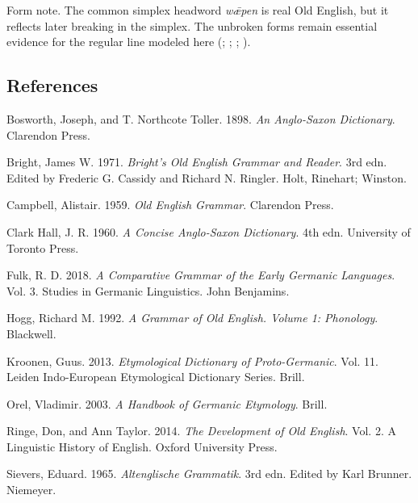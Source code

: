 \documentclass[
  british,
  a4paper,
]{article}
\newlength{\cslhangindent}
\newenvironment{CSLReferences}[2] %
 {\begin{list}{}{%
  \setlength{\itemindent}{0pt}
  \setlength{\leftmargin}{0pt}
  \setlength{\parsep}{0pt}
  \ifodd #1
   \setlength{\leftmargin}{\cslhangindent}
   \setlength{\itemindent}{-1\cslhangindent}
  \fi
  \setlength{\itemsep}{#2\baselineskip}}}
 {\end{list}}
\begin{document}
Form note. The common simplex headword \emph{wǣpen} is real Old English,
but it reflects later breaking in the simplex. The unbroken forms remain
essential evidence for the regular line modeled here
(;
;
;
).

\clearpage

\subsection*{References}\label{references}

\protect{}\label{refs}
\begin{CSLReferences}{1}{1}
Bosworth, Joseph, and T. Northcote Toller. 1898. \emph{An {Anglo-Saxon}
Dictionary}. Clarendon Press.

Bright, James W. 1971. \emph{Bright's {Old English} Grammar and Reader}.
3rd edn. Edited by Frederic G. Cassidy and Richard N. Ringler. Holt,
Rinehart; Winston.

Campbell, Alistair. 1959. \emph{Old {English} Grammar}. Clarendon Press.

Clark Hall, J. R. 1960. \emph{A Concise {Anglo-Saxon} Dictionary}. 4th
edn. University of Toronto Press.

Fulk, R. D. 2018. \emph{A Comparative Grammar of the Early {Germanic}
Languages}. Vol. 3. Studies in Germanic Linguistics. John Benjamins.

Hogg, Richard M. 1992. \emph{A Grammar of Old English. Volume 1:
Phonology}. Blackwell.

Kroonen, Guus. 2013. \emph{Etymological Dictionary of {Proto-Germanic}}.
Vol. 11. Leiden Indo-European Etymological Dictionary Series. Brill.

Orel, Vladimir. 2003. \emph{A Handbook of {Germanic} Etymology}. Brill.

Ringe, Don, and Ann Taylor. 2014. \emph{The Development of {Old
English}}. Vol. 2. A Linguistic History of English. Oxford University
Press.

Sievers, Eduard. 1965. \emph{Altenglische Grammatik}. 3rd edn. Edited by
Karl Brunner. Niemeyer.

\end{CSLReferences}
\end{document}
